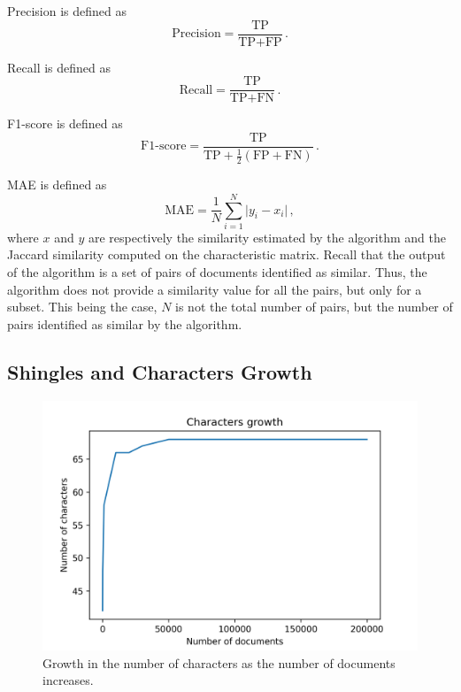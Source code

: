 \documentclass[runningheads]{llncs}
\begin{document}
Precision is defined as 
\[
  \text{Precision} = \frac{\text{TP}}{\text{TP} + \text{FP}}\,.
\]

Recall is defined as
\[
  \text{Recall} = \frac{\text{TP}}{\text{TP} + \text{FN}}\,.
\]

F1-score is defined as
\[
  \text{F1-score} = \frac{\text{TP}}{\text{TP} + \frac{1}{2}(\text{FP} + \text{FN})}\,.
\]

MAE is defined as
\[
  \text{MAE} = \frac{1}{N}\sum_{i=1}^N \lvert y_i - x_i \rvert \,,
\]
where $x$ and $y$ are respectively the similarity estimated by the algorithm and the Jaccard similarity computed on the characteristic matrix. Recall that the output of the algorithm is a set of pairs of documents identified as similar. Thus, the algorithm does not provide a similarity value for all the pairs, but only for a subset. This being the case, $N$ is not the total number of pairs, but the number of pairs identified as similar by the algorithm. 

\subsection{Shingles and Characters Growth}
\label{subsec:experiments:shingles}

\begin{figure}
  \center
  \includegraphics[width=1\textwidth]{../img/char_growth.png}
  \caption{Growth in the number of characters as the number of documents increases.} 
  \label{fig:experiments:char_growth}
\end{figure}
\end{document}
